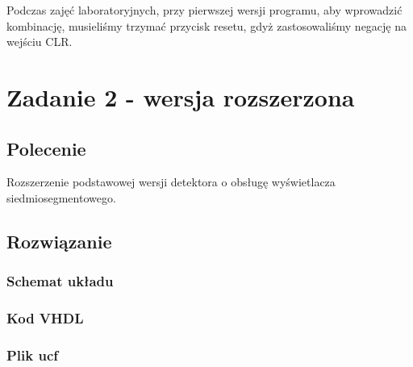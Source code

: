 \documentclass[a4paper,12pt]{extarticle}  %
\begin{document}
    Podczas zajęć laboratoryjnych, przy pierwszej wersji programu, aby wprowadzić kombinację, musieliśmy trzymać przycisk resetu, gdyż zastosowaliśmy negację na wejściu CLR.
    
    \newpage
\section{Zadanie 2 - wersja rozszerzona}
    \subsection{Polecenie}
    Rozszerzenie podstawowej wersji detektora o obsługę wyświetlacza siedmiosegmentowego.
    \subsection{Rozwiązanie}
        \subsubsection{Schemat układu}
        \begin{figure}[H]
            \centering
        \end{figure}
        \subsubsection{Kod VHDL}
        
        \subsubsection{Plik ucf}
        
\newpage
\end{document}
